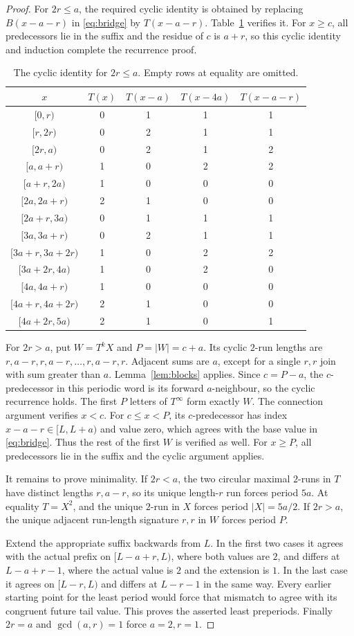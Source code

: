 \documentclass[11pt]{article}
\theoremstyle{remark}\newtheorem{remark}[theorem]{Remark}
\newcommand{\per}{^{\infty}}
\newcommand{\half}[2]{[#1,#2)}
\begin{document}
\begin{proof}
For $2r\le a$, the required cyclic identity is obtained by replacing $B(x-a-r)$ in \eqref{eq:bridge} by $T(x-a-r)$. Table~\ref{tab:small} verifies it. For $x\ge c$, all predecessors lie in the suffix and the residue of $c$ is $a+r$, so this cyclic identity and induction complete the recurrence proof.
\begin{table}[ht]\centering\small
\begin{tabular}{c|c|ccc}\toprule
$x$ & $T(x)$ & $T(x-a)$ & $T(x-4a)$ & $T(x-a-r)$\\\midrule
$[0,r)$&0&1&1&1\\
$[r,2r)$&0&2&1&1\\
$[2r,a)$&0&2&1&2\\
$[a,a+r)$&1&0&2&2\\
$[a+r,2a)$&1&0&0&0\\
$[2a,2a+r)$&2&1&0&0\\
$[2a+r,3a)$&0&1&1&1\\
$[3a,3a+r)$&0&2&1&1\\
$[3a+r,3a+2r)$&1&0&2&2\\
$[3a+2r,4a)$&1&0&2&0\\
$[4a,4a+r)$&1&0&0&0\\
$[4a+r,4a+2r)$&2&1&0&0\\
$[4a+2r,5a)$&2&1&0&1\\\bottomrule
\end{tabular}
\caption{The cyclic identity for $2r\le a$. Empty rows at equality are omitted.}\label{tab:small}
\end{table}

For $2r>a$, put $W=T^kX$ and $P=|W|=c+a$. Its cyclic $2$-run lengths are $r,a-r,r,a-r,\ldots,r,a-r,r$. Adjacent sums are $a$, except for a single $r,r$ join with sum greater than $a$. Lemma~\ref{lem:blocks} applies. Since $c=P-a$, the $c$-predecessor in this periodic word is its forward $a$-neighbour, so the cyclic recurrence holds. The first $P$ letters of $T\per$ form exactly $W$. The connection argument verifies $x<c$. For $c\le x<P$, its $c$-predecessor has index $x-a-r\in\half L{L+a}$ and value zero, which agrees with the base value in \eqref{eq:bridge}. Thus the rest of the first $W$ is verified as well. For $x\ge P$, all predecessors lie in the suffix and the cyclic argument applies.

It remains to prove minimality. If $2r<a$, the two circular maximal $2$-runs in $T$ have distinct lengths $r,a-r$, so its unique length-$r$ run forces period $5a$. At equality $T=X^2$, and the unique $2$-run in $X$ forces period $|X|=5a/2$. If $2r>a$, the unique adjacent run-length signature $r,r$ in $W$ forces period $P$.

Extend the appropriate suffix backwards from $L$. In the first two cases it agrees with the actual prefix on $\half{L-a+r}{L}$, where both values are $2$, and differs at $L-a+r-1$, where the actual value is $2$ and the extension is $1$. In the last case it agrees on $\half{L-r}{L}$ and differs at $L-r-1$ in the same way. Every earlier starting point for the least period would force that mismatch to agree with its congruent future tail value. This proves the asserted least preperiods. Finally $2r=a$ and $\gcd(a,r)=1$ force $a=2,r=1$.
\end{proof}
\end{document}
